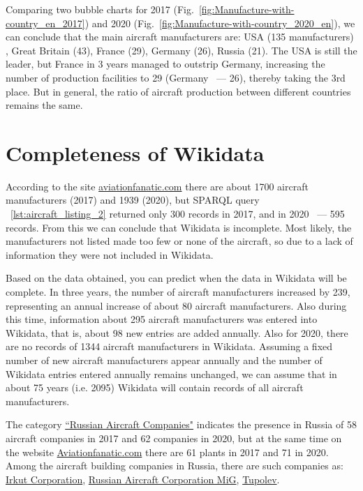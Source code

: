 Comparing two bubble charts for 2017 (Fig.~\ref{fig:Manufacture-with-country_en_2017}) and 2020 (Fig.~\ref{fig:Manufacture-with-country_2020_en}), 
we can conclude that the main aircraft manufacturers are: USA (135 manufacturers) , Great Britain (43), France (29), Germany (26), Russia (21). 
The USA is still the leader, but France in 3 years managed to outstrip Germany, increasing the number of production facilities to 29 
(Germany ~--- 26), thereby taking the 3rd place. But in general, the ratio of aircraft production between different countries remains the same.


\section{Completeness of Wikidata}

According to the site \href{https://www.aviationfanatic.com/}{aviationfanatic.com} there are about \num{1700} aircraft manufacturers (2017) 
and \num{1939} (2020), but SPARQL query ~\ref{lst:aircraft_listing_2} returned only 300 records in 2017, and in 2020 ~--- 595 records. 
From this we can conclude that Wikidata is incomplete. Most likely, the manufacturers not listed made too few or none of the aircraft, 
so due to a lack of information they were not included in Wikidata.

Based on the data obtained, you can predict when the data in Wikidata will be complete. In three years, the number of aircraft manufacturers 
increased by 239, representing an annual increase of about 80 aircraft manufacturers. Also during this time, information about 295 aircraft 
manufacturers was entered into Wikidata, that is, about 98 new entries are added annually. Also for 2020, there are no records of \num{1344} 
aircraft manufacturers in Wikidata. Assuming a fixed number of new aircraft manufacturers appear annually and the number of Wikidata entries 
entered annually remains unchanged, we can assume that in about 75 years (i.e. 2095) Wikidata will contain records of all aircraft manufacturers.

The category \href{https://cutt.ly/NhrKnWn}{``Russian Aircraft Companies"} indicates the presence in Russia of 58 aircraft companies in 2017 and 
62 companies in 2020, but at the same time on the website \href{https://www.aviationfanatic.com/}{Aviationfanatic.com} there are 61 
plants in 2017 and 71 in 2020. Among the aircraft building companies in Russia, there are such companies as: \href{https://en.wikipedia.org/wiki/Irkut_Corporation}{Irkut Corporation}, 
\href{https://en.wikipedia.org/wiki/Russian_Aircraft_Corporation_MiG}{Russian Aircraft Corporation MiG}, 
\href{https://en.wikipedia.org/wiki/Tupolev}{Tupolev}.

